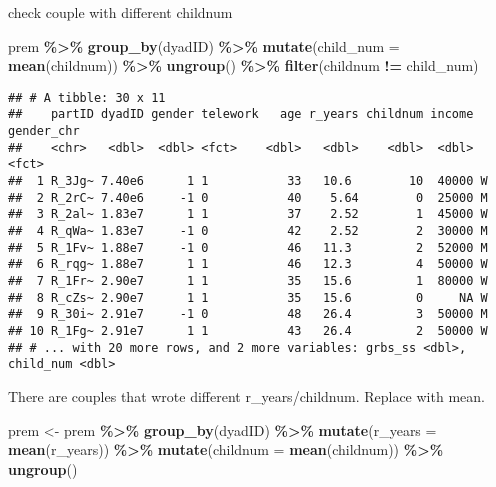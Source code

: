 \documentclass[
]{article}
\newenvironment{Shaded}{\begin{snugshade}}{\end{snugshade}}
\newcommand{\DataTypeTok}[1]{\textcolor[rgb]{0.13,0.29,0.53}{#1}}
\newcommand{\KeywordTok}[1]{\textcolor[rgb]{0.13,0.29,0.53}{\textbf{#1}}}
\newcommand{\NormalTok}[1]{#1}
\newcommand{\OperatorTok}[1]{\textcolor[rgb]{0.81,0.36,0.00}{\textbf{#1}}}
\newcommand{\StringTok}[1]{\textcolor[rgb]{0.31,0.60,0.02}{#1}}
\begin{document}
check couple with different childnum

\begin{Shaded}
\begin{Highlighting}[]
\NormalTok{prem }\OperatorTok{\%\textgreater{}\%}
\StringTok{  }\KeywordTok{group\_by}\NormalTok{(dyadID) }\OperatorTok{\%\textgreater{}\%}
\StringTok{  }\KeywordTok{mutate}\NormalTok{(}\DataTypeTok{child\_num =} \KeywordTok{mean}\NormalTok{(childnum)) }\OperatorTok{\%\textgreater{}\%}
\StringTok{  }\KeywordTok{ungroup}\NormalTok{() }\OperatorTok{\%\textgreater{}\%}
\StringTok{  }\KeywordTok{filter}\NormalTok{(childnum }\OperatorTok{!=}\StringTok{ }\NormalTok{child\_num)}
\end{Highlighting}
\end{Shaded}

\begin{verbatim}
## # A tibble: 30 x 11
##    partID dyadID gender telework   age r_years childnum income gender_chr
##    <chr>   <dbl>  <dbl> <fct>    <dbl>   <dbl>    <dbl>  <dbl> <fct>     
##  1 R_3Jg~ 7.40e6      1 1           33   10.6        10  40000 W         
##  2 R_2rC~ 7.40e6     -1 0           40    5.64        0  25000 M         
##  3 R_2al~ 1.83e7      1 1           37    2.52        1  45000 W         
##  4 R_qWa~ 1.83e7     -1 0           42    2.52        2  30000 M         
##  5 R_1Fv~ 1.88e7     -1 0           46   11.3         2  52000 M         
##  6 R_rqg~ 1.88e7      1 1           46   12.3         4  50000 W         
##  7 R_1Fr~ 2.90e7      1 1           35   15.6         1  80000 W         
##  8 R_cZs~ 2.90e7      1 1           35   15.6         0     NA W         
##  9 R_30i~ 2.91e7     -1 0           48   26.4         3  50000 M         
## 10 R_1Fg~ 2.91e7      1 1           43   26.4         2  50000 W         
## # ... with 20 more rows, and 2 more variables: grbs_ss <dbl>, child_num <dbl>
\end{verbatim}

There are couples that wrote different r\_years/childnum. Replace with
mean.

\begin{Shaded}
\begin{Highlighting}[]
\NormalTok{prem \textless{}{-}}\StringTok{ }\NormalTok{prem }\OperatorTok{\%\textgreater{}\%}
\StringTok{  }\KeywordTok{group\_by}\NormalTok{(dyadID) }\OperatorTok{\%\textgreater{}\%}
\StringTok{  }\KeywordTok{mutate}\NormalTok{(}\DataTypeTok{r\_years =} \KeywordTok{mean}\NormalTok{(r\_years)) }\OperatorTok{\%\textgreater{}\%}
\StringTok{  }\KeywordTok{mutate}\NormalTok{(}\DataTypeTok{childnum =} \KeywordTok{mean}\NormalTok{(childnum)) }\OperatorTok{\%\textgreater{}\%}
\StringTok{  }\KeywordTok{ungroup}\NormalTok{()}
\end{Highlighting}
\end{Shaded}
\end{document}
